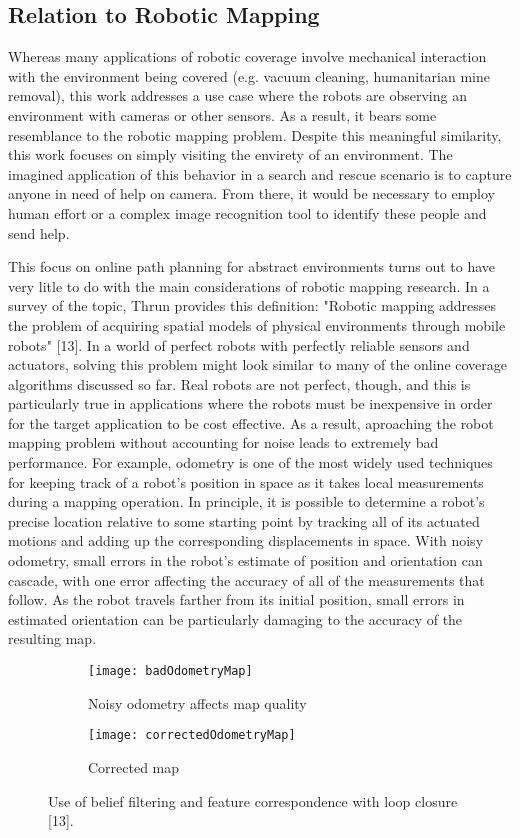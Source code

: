 \subsection{Relation to Robotic Mapping}

Whereas many applications of robotic coverage involve mechanical interaction with the environment being covered (e.g. vacuum cleaning, humanitarian mine removal), this work addresses a use case where the robots are observing an environment with cameras or other sensors. As a result, it bears some resemblance to the robotic mapping problem. Despite this meaningful similarity, this work focuses on simply visiting the envirety of an environment. The imagined application of this behavior in a search and rescue scenario is to capture anyone in need of help on camera. From there, it would be necessary to employ human effort or a complex image recognition tool to identify these people and send help.

This focus on online path planning for abstract environments turns out to have very litle to do with the main considerations of robotic mapping research. In a survey of the topic, Thrun provides this definition: "Robotic mapping addresses the problem of acquiring spatial models of physical environments through mobile robots" [13]. In a world of perfect robots with perfectly reliable sensors and actuators, solving this problem might look similar to many of the online coverage algorithms discussed so far. Real robots are not perfect, though, and this is particularly true in applications where the robots must be inexpensive in order for the target application to be cost effective. As a result, aproaching the robot mapping problem without accounting for noise leads to extremely bad performance. For example, odometry is one of the most widely used techniques for keeping track of a robot's position in space as it takes local measurements during a mapping operation. In principle, it is possible to determine a robot's precise location relative to some starting point by tracking all of its actuated motions and adding up the corresponding displacements in space. With noisy odometry, small errors in the robot's estimate of position and orientation can cascade, with one error affecting the accuracy of all of the measurements that follow. As the robot travels farther from its initial position, small errors in estimated orientation can be particularly damaging to the accuracy of the resulting map.

\begin{figure}[H]
\begin{subfigure}{.5\textwidth}
  \centering
  \texttt{[image: badOdometryMap]}
  \caption{Noisy odometry affects map quality}
\end{subfigure}
\begin{subfigure}{.5\textwidth}
  \centering
  \texttt{[image: correctedOdometryMap]}
  \caption{Corrected map}
\end{subfigure}
\caption[Odometry Errors and Corrected Map]{Use of belief filtering and feature correspondence with loop closure [13].}
\end{figure}

